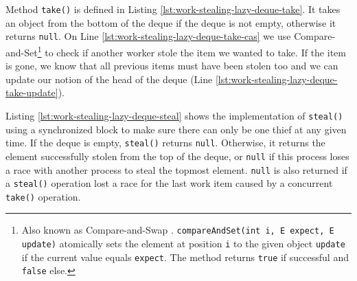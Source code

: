 

\VerbatimFootnotes Method \lstinline!take()! is defined in Listing
\ref{lst:work-stealing-lazy-deque-take}. It takes an object from the
bottom of the deque if the deque is not empty, otherwise it returns
\lstinline!null!. On Line \ref{lst:work-stealing-lazy-deque-take-cas}
we use Compare-and-Set\footnote{Also known as Compare-and-Swap
  \cite{IBM1974}. \verb!compareAndSet(int i, E expect, E update)!
  atomically sets the element at position \verb!i! to the given object
  \verb!update! if the current value equals \verb!expect!. The method
  returns \verb!true! if successful and \verb!false! else.} to check
if another worker stole the item we wanted to take. If the item is
gone, we know that all previous items must have been stolen too and we
can update our notion of the head of the deque (Line
\ref{lst:work-stealing-lazy-deque-take-update}).



Listing \ref{lst:work-stealing-lazy-deque-steal} shows the
implementation of \lstinline!steal()! using a synchronized block to
make sure there can only be one thief at any given time. If the deque
is empty, \lstinline!steal()! returns \lstinline!null!. Otherwise, it
returns the element successfully stolen from the top of the deque, or
\lstinline!null! if this process loses a race with another process to
steal the topmost element. \lstinline!null! is also returned if a
\lstinline!steal()! operation lost a race for the last work item
caused by a concurrent \lstinline!take()! operation.




